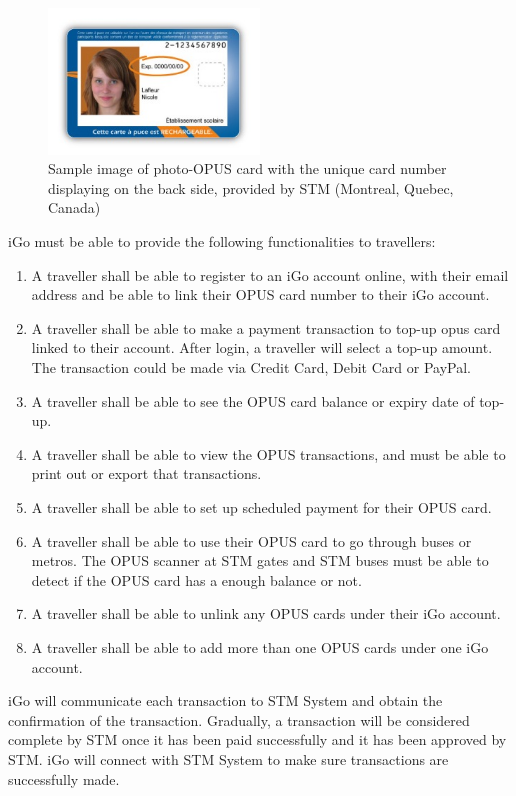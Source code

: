 \documentclass[11pt, english]{report}
\begin{document}
\begin{figure}[h!]
  
  \includegraphics[width=0.5\textwidth]{images/opus-back.jpg}
  \centering
  \caption{Sample image of photo-OPUS card with the unique card number displaying on the back side, provided by STM (Montreal, Quebec, Canada)\cite{card_opus}
}
\end{figure}

iGo must be able to provide the following functionalities to  travellers:
\begin{enumerate}
  \item A traveller shall be able to register to an iGo account online, with their email address and be able to link their OPUS card number to their iGo account.
  \item A traveller shall be able to make a payment transaction to top-up opus card linked to their account. After login, a traveller will select a top-up amount. The transaction could be made via Credit Card, Debit Card or PayPal. 
  \item A traveller shall be able to see the OPUS card balance or expiry date of top-up. 
  \item A traveller shall be able to view the OPUS transactions, and must be able to print out or export that transactions.
   \item A traveller shall be able to set up scheduled payment for their OPUS card. 
  \item A traveller shall be able to use their OPUS card to go through buses or metros. The OPUS scanner at STM gates and STM buses must be able to detect if the OPUS card has a enough balance or not.
  \item A traveller shall be able to unlink any OPUS cards under their iGo account.
  \item A traveller shall be able to add more than one OPUS cards under one iGo account.

\end{enumerate}

iGo will communicate each transaction to STM System and obtain the confirmation of the transaction. Gradually, a transaction will be considered complete by STM once it has been paid successfully and it has been approved by STM. iGo will connect with STM System to make sure transactions are successfully made.\\
\end{document}

